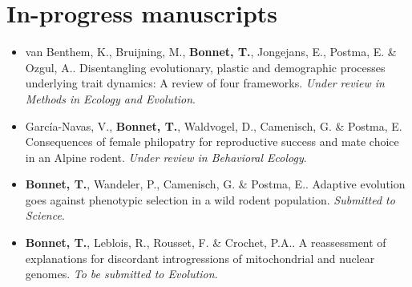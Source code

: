 \documentclass[a4paper,oneside,10pt]{article} %
\begin{document}
\section*{In-progress manuscripts}
\vspace{10pt}
\begin{itemize}
\item van Benthem, K., Bruijning, M., \textbf{Bonnet, T.}, Jongejans, E., Postma, E. \& Ozgul, A.. Disentangling evolutionary, plastic and demographic processes underlying trait dynamics: A review of four frameworks. \textit{Under review in Methods in Ecology and Evolution}.
\item García-Navas, V., \textbf{Bonnet, T.}, Waldvogel, D., Camenisch, G. \& Postma, E. Consequences of female philopatry for reproductive success and mate choice in an Alpine rodent. \textit{Under review in Behavioral Ecology}.
\item \textbf{Bonnet, T.}, Wandeler, P., Camenisch, G. \& Postma, E.. Adaptive evolution goes against phenotypic selection in a wild rodent population. \textit{Submitted to Science}.
\item \textbf{Bonnet, T.}, Leblois, R., Rousset, F. \& Crochet, P.A.. A reassessment of explanations for discordant introgressions of mitochondrial and nuclear genomes. \textit{To be submitted to Evolution}.
\end{itemize}
\end{document}
